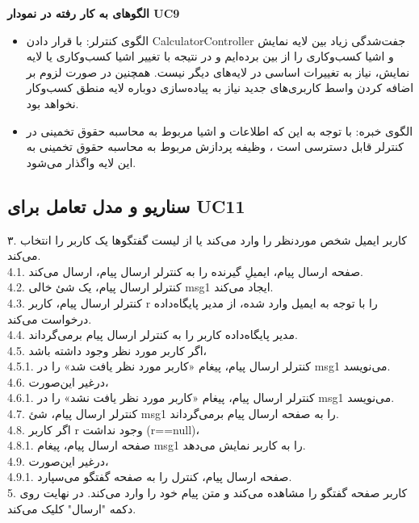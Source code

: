 \documentclass[12pt]{article}
\begin{document}
	\textbf{الگوهای به کار رفته در نمودار UC9}
	\begin{itemize}
		\item الگوی کنترلر: با قرار‌ دادن CalculatorController جفت‌شدگی زیاد بین لایه نمایش و اشیا کسب‌و‌کاری را از بین برده‌ایم و در‌ نتیجه با تغییر اشیا کسب‌وکاری یا لایه نمایش، نیاز به تغییرات اساسی در لایه‌های  دیگر نیست. همچنین در صورت لزوم بر اضافه کردن واسط کاربری‌های جدید نیاز به پیاده‌سازی دوباره لایه منطق کسب‌و‌کار نخواهد بود.
		\item 	الگوی خبره: با توجه به این که اطلاعات و اشیا مربوط به محاسبه حقوق تخمینی در کنترلر قابل دسترسی است ، وظیفه پردازش مربوط به محاسبه حقوق تخمینی به این لایه واگذار می‌شود.
	\end{itemize}

	\newpage
	\subsection{سناریو و مدل تعامل برای UC11}
	۳. کاربر ایمیل شخص مورد‌نظر را وارد می‌کند یا از لیست گفتگوها یک کاربر را انتخاب می‌کند.\\
	4.1.  صفحه ارسال پیام، ایمیلِ گیرنده را به کنترلر ارسال پیام، ارسال می‌کند.\\
	4.2.  کنترلر ارسال پیام، یک شئ خالی msg1 ایجاد می‌کند.\\
	4.3.  کنترلر ارسال پیام، کاربر r را با توجه به ایمیل وارد شده، از مدیر پایگاه‌داده درخواست می‌کند.\\
	4.4.  مدیر پایگاه‌داده کاربر را به کنترلر ارسال پیام برمی‌گرداند.\\
	4.5.  اگر کاربر مورد نظر وجود داشته باشد،\\
	4.5.1.   کنترلر ارسال پیام، پیغام «کاربر مورد نظر یافت شد» را در msg1 می‌نویسد.\\
	4.6.  در‌غیر این‌صورت،\\
	4.6.1.   کنترلر ارسال پیام، پیغام «کاربر مورد نظر یافت نشد» را در msg1 می‌نویسد.\\
	4.7.  کنترلر ارسال پیام، شئ msg1 را به صفحه ارسال پیام برمی‌گرداند.\\
	4.8.  اگر کاربر r وجود نداشت (r==null)،\\
	4.8.1.   صفحه ارسال پیام، پیغام msg1 را به کاربر نمایش می‌دهد.\\
	4.9.  درغیر این‌صورت،\\
	4.9.1.   صفحه ارسال پیام، کنترل را به صفحه گفتگو می‌سپارد.\\
	5. کاربر صفحه گفتگو را مشاهده می‌کند و متن پیام خود را وارد می‌کند. در نهایت روی دکمه "ارسال" کلیک می‌کند.\\
\end{document}
